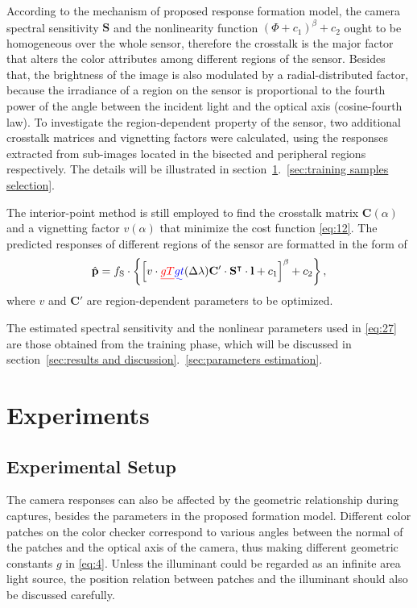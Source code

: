 \documentclass[9pt,twocolumn,twoside]{osajnl}
\providecommand{\DIFadd}[1]{{\protect\color{blue}\uwave{#1}}} %
\providecommand{\DIFdel}[1]{{\protect\color{red}\sout{#1}}}                      %
\providecommand{\DIFaddbegin}{} %
\providecommand{\DIFaddend}{} %
\providecommand{\DIFdelbegin}{} %
\providecommand{\DIFdelend}{} %
\begin{document}
According to the mechanism of proposed response formation model, the camera spectral sensitivity $\mathbf{S}$ and the nonlinearity function $(\Phi + c_1)^\beta + c_2$ ought to be homogeneous over the whole sensor, therefore the crosstalk is the major factor that alters the color attributes among different regions of the sensor. Besides that, the brightness of the image is also modulated by a radial-distributed factor, because the irradiance of a region on the sensor is proportional to the fourth power of the angle between the incident light and the optical axis (cosine-fourth law). To investigate the region-dependent property of the sensor, two additional crosstalk matrices and vignetting factors were calculated, using the responses extracted from sub-images located in the bisected and peripheral regions respectively. The details will be illustrated in section~\ref{sec:experiments}.~\ref{sec:training samples selection}.

The interior-point method is still employed to find the crosstalk matrix $\mathbf{C}(\alpha)$ and a vignetting factor $v(\alpha)$ that minimize the cost function \eqref{eq:12}. The predicted responses of different regions of the sensor are formatted in the form of
\begin{equation}
\hat{\mathbf{p}} = f_\text{S}\cdot\bigg\{\Big[v\cdot{}\DIFdelbegin \DIFdel{gT}\DIFdelend \DIFaddbegin \DIFadd{gt}\DIFaddend (\Delta\lambda)\mathbf{C}'\cdot\mathbf{S}^\intercal\cdot\mathbf{l} + c_1\Big]^\beta + c_2\bigg\}\,,
\label{eq:26}
\end{equation}
where $v$ and $\mathbf{C}'$ are region-dependent parameters to be optimized.

The estimated spectral sensitivity and the nonlinear parameters used in \eqref{eq:27} are those obtained from the training phase, which will be discussed in section~\ref{sec:results and discussion}.~\ref{sec:parameters estimation}.

\section{Experiments}\label{sec:experiments}

\subsection{Experimental Setup}

The camera responses can also be affected by the geometric relationship during captures, besides the parameters in the proposed formation model. Different color patches on the color checker correspond to various angles between the normal of the patches and the optical axis of the camera, thus making different geometric constants $g$ in \eqref{eq:4}. Unless the illuminant could be regarded as an infinite area light source, the position relation between patches and the illuminant should also be discussed carefully.
\end{document}
